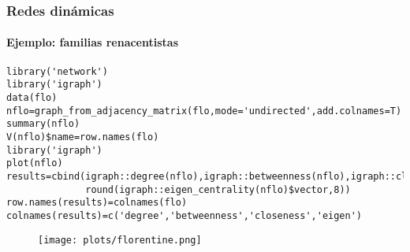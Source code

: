 \documentclass[11pt]{beamer}
\begin{document}
\begin{comment}
\begin{frame}[fragile]
 \frametitle{Análisis de redes sociales} 
Red de vínculos entre seguidores
\begin{enumerate}  \setcounter{enumi}{2}
    \item Generar el grafo a partir de los nodos y links que se encuentran en \texttt{edge\_list}
\end{enumerate}
\begin{verbatim} 
net=graph_from_data_frame(edge.list)
netsim=igraph::simplify(net, remove.multiple = T, remove.loops = T)
V(netsim)$id=V(netsim)$name

user.df=user.df %>%
  unique()%>%
  arrange(match(user_id, V(netsim)$id))
user.name=user.df%>%
  pull(name)
V(netsim)$name=user.name
V(netsim)$degree=user.df$friends_count
set.seed(123)
plot(netsim,vertex.name=V(netsim)$user.name,vertex.color="gold",
    vertex.size=log(V(netsim)$degree)*.8+0.01, 
    vertex.frame.color="gray", vertex.label.color="black",
    vertex.label.cex=0.5, vertex.label.dist=1, 
    edge.curved=0.5,edge.arrow.size=.2,
    vertex.label.cex=.5,vertex.label=user.name)
\end{verbatim}
\end{frame}    
\end{comment}


\begin{frame}[fragile]
\frametitle{Redes dinámicas}
\framesubtitle{Ejemplo: familias renacentistas}
    \begin{verbatim} 
library('network')
library('igraph')
data(flo)
nflo=graph_from_adjacency_matrix(flo,mode='undirected',add.colnames=T)
summary(nflo)
V(nflo)$name=row.names(flo)
library('igraph')
plot(nflo)
results=cbind(igraph::degree(nflo),igraph::betweenness(nflo),igraph::closeness(nflo),
              round(igraph::eigen_centrality(nflo)$vector,8))
row.names(results)=colnames(flo)
colnames(results)=c('degree','betweenness','closeness','eigen')     
    \end{verbatim}
 

\begin{figure}
    \centering
    \texttt{[image: plots/florentine.png]}
    \label{fig:my_label}
\end{figure}    
\end{frame}
\end{document}
